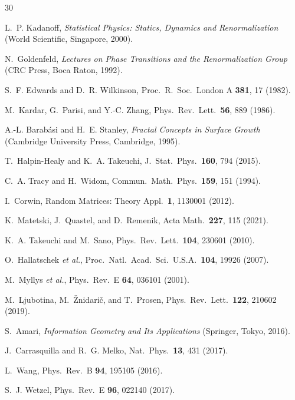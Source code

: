 \documentclass[aps,pre,twocolumn,superscriptaddress,showpacs,longbibliography]{revtex4-2}
\begin{document}
\begin{thebibliography}{30}

L.~P. Kadanoff, \emph{Statistical Physics: Statics, Dynamics and Renormalization} (World Scientific, Singapore, 2000).

N.~Goldenfeld, \emph{Lectures on Phase Transitions and the Renormalization Group} (CRC Press, Boca Raton, 1992).

S.~F. Edwards and D.~R. Wilkinson, Proc.\ R.\ Soc.\ London A \textbf{381}, 17 (1982).

M.~Kardar, G.~Parisi, and Y.-C. Zhang, Phys.\ Rev.\ Lett.\ \textbf{56}, 889 (1986).

A.-L. Barab\'asi and H.~E. Stanley, \emph{Fractal Concepts in Surface Growth} (Cambridge University Press, Cambridge, 1995).

T.~Halpin-Healy and K.~A. Takeuchi, J.\ Stat.\ Phys.\ \textbf{160}, 794 (2015).

C.~A. Tracy and H.~Widom, Commun.\ Math.\ Phys.\ \textbf{159}, 151 (1994).

I.~Corwin, Random Matrices: Theory Appl.\ \textbf{1}, 1130001 (2012).

K.~Matetski, J.~Quastel, and D.~Remenik, Acta Math.\ \textbf{227}, 115 (2021).

K.~A. Takeuchi and M.~Sano, Phys.\ Rev.\ Lett.\ \textbf{104}, 230601 (2010).

O.~Hallatschek \emph{et al.}, Proc.\ Natl.\ Acad.\ Sci.\ U.S.A.\ \textbf{104}, 19926 (2007).

M.~Myllys \emph{et al.}, Phys.\ Rev.\ E \textbf{64}, 036101 (2001).

M.~Ljubotina, M.~\v{Z}nidari\v{c}, and T.~Prosen, Phys.\ Rev.\ Lett.\ \textbf{122}, 210602 (2019).

S.~Amari, \emph{Information Geometry and Its Applications} (Springer, Tokyo, 2016).

J.~Carrasquilla and R.~G. Melko, Nat.\ Phys.\ \textbf{13}, 431 (2017).

L.~Wang, Phys.\ Rev.\ B \textbf{94}, 195105 (2016).

S.~J. Wetzel, Phys.\ Rev.\ E \textbf{96}, 022140 (2017).


\end{thebibliography}
\end{document}
